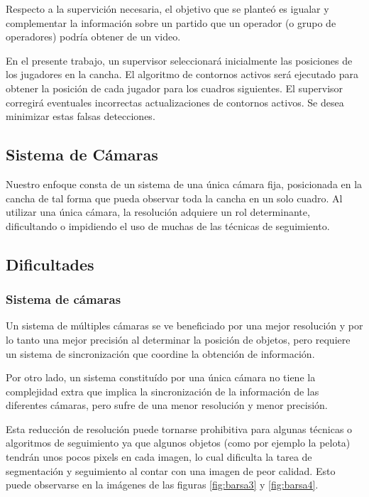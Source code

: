 \documentclass[a4paper,10pt]{article}
\begin{document}

Respecto a la supervición necesaria, el objetivo que se planteó es igualar y
complementar la información sobre un partido que un operador (o grupo de
operadores) podría obtener de un video.

En el presente trabajo, un supervisor seleccionará inicialmente las posiciones
de los jugadores en la cancha. El algoritmo de contornos activos será
ejecutado para obtener la posición de cada jugador para los cuadros siguientes.
El supervisor corregirá eventuales incorrectas actualizaciones de contornos
activos. Se desea minimizar estas falsas detecciones.

\subsection{Sistema de Cámaras}

Nuestro enfoque consta de un sistema de una única cámara fija, posicionada en
la cancha de tal forma que pueda observar toda la cancha en un solo cuadro. Al
utilizar una única cámara, la resolución adquiere un rol determinante,
dificultando o impidiendo el uso de muchas de las técnicas de seguimiento.

\subsection{Dificultades}

\subsubsection{Sistema de cámaras}

Un sistema de múltiples cámaras se ve beneficiado por una mejor resolución y
por lo tanto una mejor precisión al determinar la posición de objetos, pero
requiere un sistema de sincronización que coordine la obtención de información.

Por otro lado, un sistema constituído por una única cámara no tiene la
complejidad extra que implica la sincronización de la información de las
diferentes cámaras, pero sufre de una menor resolución y menor precisión.

Esta reducción de resolución puede tornarse prohibitiva para algunas técnicas o
algoritmos de seguimiento ya que algunos objetos (como por ejemplo la pelota)
tendrán unos pocos pixels en cada imagen, lo cual dificulta la tarea de
segmentación y seguimiento al contar con una imagen de peor calidad.  Esto
puede observarse en la imágenes de las figuras \ref{fig:barsa3} y
\ref{fig:barsa4}.
\end{document}
